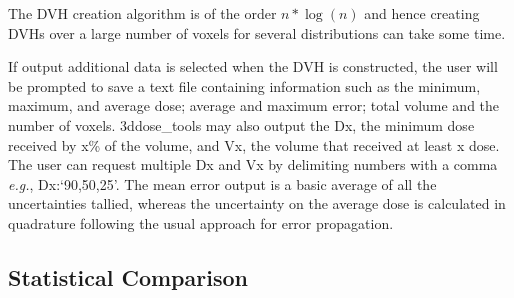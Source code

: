 \documentclass[12pt]{article}
\newcommand{\GUI}{3ddose\_tools}
\newcommand{\eg}{{\it e.g.}, }
\begin{document}
\begin{itemize}
  The DVH creation algorithm is of the order $n*\log(n)$ and hence creating DVHs over a large number of voxels for several distributions can take some time.
  
  If output additional data is selected when the DVH is constructed, the user will be prompted to save a text file containing information such as the minimum, maximum, and average dose; average and maximum error; total volume and the number of voxels.  \GUI{} may also output the Dx, the minimum dose received by x\% of the volume, and Vx, the volume that received at least x dose.  The user can request multiple Dx and Vx by delimiting numbers with a comma \eg Dx:`90,50,25'.  The mean error output is a basic average of all the uncertainties tallied, whereas the uncertainty on the average dose is calculated in quadrature following the usual approach for error propagation.
  \end{itemize}

  
  \subsection{Statistical Comparison} 
  
\end{document}
